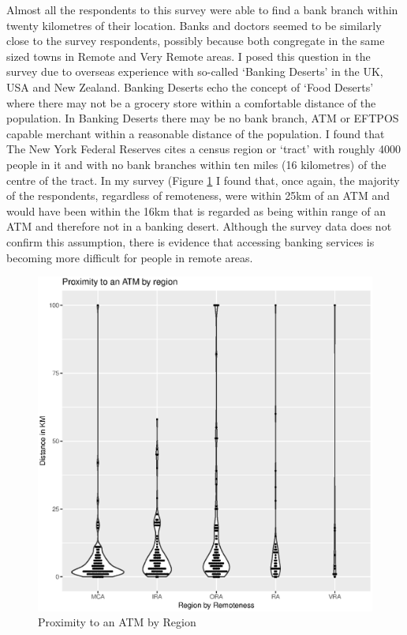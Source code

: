 Almost all the respondents to this survey were able to find a bank branch within twenty kilometres of their location. Banks and doctors seemed to be similarly close to the survey respondents, possibly because both congregate in the same sized towns in Remote and Very Remote areas. I posed this question in the survey due to overseas experience with so-called `Banking Deserts' in the UK, USA and New Zealand. Banking Deserts echo the concept of `Food Deserts' where there may not be a grocery store within a comfortable distance of the population. In Banking Deserts there may be no bank branch, ATM or EFTPOS capable merchant within a reasonable distance of the population.  I found that The New York Federal Reserves cites a census region or `tract' with roughly 4000 people in it and with no bank branches within ten miles (16 kilometres) of the centre of the tract. In my survey (Figure \ref{fig:VC08ATMProxRegions} I found that, once again, the majority of the respondents, regardless of remoteness, were within 25km of an ATM and would have been within the 16km that is regarded as being within range of an ATM and therefore not in a banking desert. Although the survey data does not confirm this assumption, there is evidence that accessing banking services is becoming more difficult for people in remote areas.
\begin{figure}[ht]
\centering
\includegraphics[scale=0.5]{figures/VChart08-Proximity2ATM.eps} 
\caption{Proximity to an ATM by Region}\label{fig:VC08ATMProxRegions}
\end{figure}

